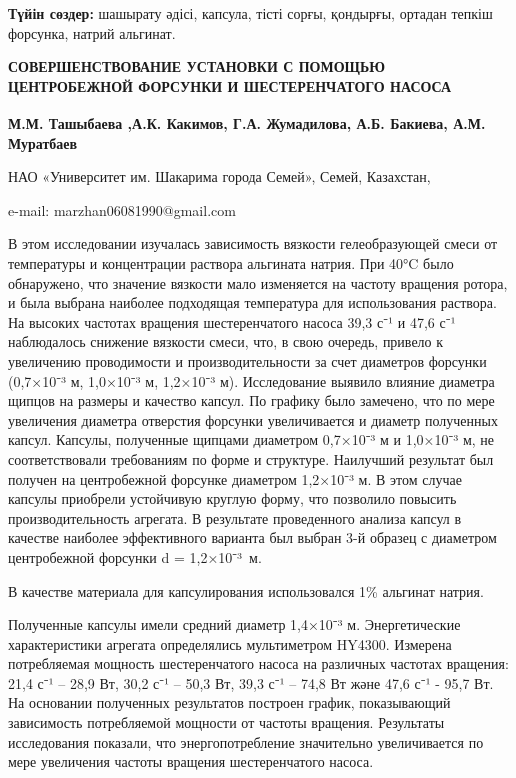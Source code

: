 {\bfseries Түйін сөздер:} шашырату әдісі, капсула, тісті сорғы, қондырғы,
ортадан тепкіш форсунка, натрий альгинат.

\begin{articleheader}
{\bfseries СОВЕРШЕНСТВОВАНИЕ УСТАНОВКИ С ПОМОЩЬЮ ЦЕНТРОБЕЖНОЙ ФОРСУНКИ И
ШЕСТЕРЕНЧАТОГО НАСОСА}

{\bfseries
М.М. Ташыбаева\textsuperscript{\envelope }
,А.К. Какимов,
Г.А. Жумадилова,
А.Б. Бакиева,
А.М. Муратбаев
}
\end{articleheader}

\begin{affiliation}
НАО «Университет им. Шакарима города Семей», Семей, Казахстан,

e-mail: marzhan06081990@gmail.com
\end{affiliation}

В этом исследовании изучалась зависимость вязкости гелеобразующей смеси
от температуры и концентрации раствора альгината натрия. При 40°C было
обнаружено, что значение вязкости мало изменяется на частоту вращения
ротора, и была выбрана наиболее подходящая температура для использования
раствора. На высоких частотах вращения шестеренчатого насоса 39,3 с⁻¹ и
47,6 с⁻¹ наблюдалось снижение вязкости смеси, что, в свою очередь,
привело к увеличению проводимости и производительности за счет диаметров
форсунки (0,7×10⁻³ м, 1,0×10⁻³ м, 1,2×10⁻³ м). Исследование выявило
влияние диаметра щипцов на размеры и качество капсул. По графику было
замечено, что по мере увеличения диаметра отверстия форсунки
увеличивается и диаметр полученных капсул. Капсулы, полученные щипцами
диаметром 0,7×10⁻³ м и 1,0×10⁻³ м, не соответствовали требованиям по
форме и структуре. Наилучший результат был получен на центробежной
форсунке диаметром 1,2×10⁻³ м. В этом случае капсулы приобрели
устойчивую круглую форму, что позволило повысить производительность
агрегата. В результате проведенного анализа капсул в качестве наиболее
эффективного варианта был выбран 3-й образец с диаметром центробежной
форсунки d = 1,2×10⁻³~м.

В качестве материала для капсулирования использовался 1\% альгинат натрия.

Полученные капсулы имели средний диаметр 1,4×10⁻³ м. Энергетические
характеристики агрегата определялись мультиметром HY4300. Измерена
потребляемая мощность шестеренчатого насоса на различных частотах
вращения: 21,4 с⁻¹ -- 28,9 Вт, 30,2 с⁻¹ -- 50,3 Вт, 39,3 с⁻¹ -- 74,8 Вт
және 47,6 с⁻¹ - 95,7 Вт. На основании полученных результатов построен
график, показывающий зависимость потребляемой мощности от частоты
вращения. Результаты исследования показали, что энергопотребление
значительно увеличивается по мере увеличения частоты вращения
шестеренчатого насоса.

